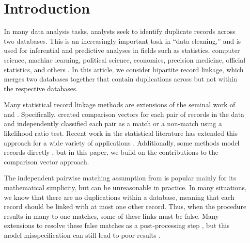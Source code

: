 \documentclass[ba]{imsart}
\begin{document}


\section{Introduction}
\label{sec:introduction}

In many data analysis tasks, analysts seek to identify duplicate records across two databases. This is an increasingly important task in ``data cleaning,'' and is used for inferential and predictive analyses in fields such as statistics, computer science, machine learning, political science, economics, precision medicine, official statistics, and others \citep{christen_2012, gutman2013bayesian, DalzellReiter18, tang2020}. In this article, we consider bipartite record linkage, which merges two databases together that contain duplications across but not within the respective databases. 

Many statistical record linkage methods are extensions of the seminal work of \cite{fellegi_theory_1969} and \cite{newcombe_automatic_1959}. Specifically, \cite{fellegi_theory_1969} created comparison vectors for each pair of records in the data and independently classified each pair as a match or a non-match using a likelihood ratio test. Recent work in the statistical literature has extended this approach for a wide variety of applications \citep{Winkler1990, fair2004generalized, wagner2014person, gill2003english, enamorado2019using, aleshinguendel2021multifile}. Additionally, some methods model records directly \citep{steorts_bayesian_2016, marchant_distributed_2019, betancourt2021prior}, but in this paper, we build on the contributions to the comparison vector approach. 


The independent pairwise matching assumption from \cite{fellegi_theory_1969} is popular mainly for its mathematical simplicity, but can be unreasonable in practice. In many situations, we know that there are no duplications within a database, meaning that each record should be linked with at most one other record. Thus, when the procedure results in many to one matches, some of these links must be false. Many extensions to \cite{fellegi_theory_1969} resolve these false matches as a post-processing step \citep{jaro1989}, but this model misspecification can still lead to poor results \citep{sadinle_bayesian_2017}.
\end{document}
